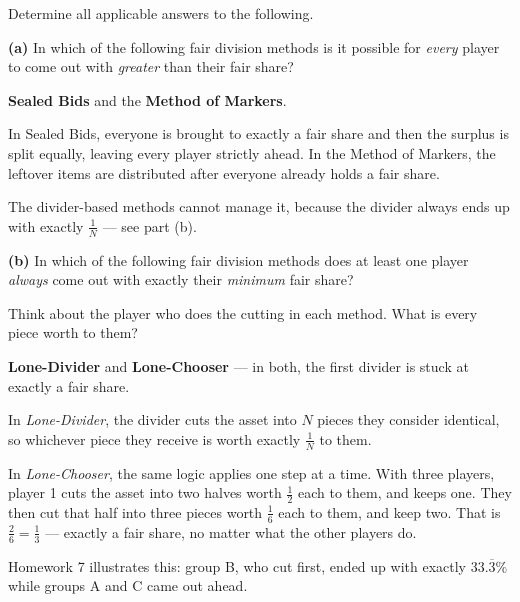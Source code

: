 \documentclass[12pt]{ximera}
\begin{document}
\begin{problem}
Determine all applicable answers to the following.

\begin{prompt}
\textbf{(a)} In which of the following fair division methods is it possible for
\emph{every} player to come out with \emph{greater} than their fair share?

\begin{selectAll}
\end{selectAll}

\begin{feedback}
\textbf{Sealed Bids} and the \textbf{Method of Markers}.

In Sealed Bids, everyone is brought to exactly a fair share and then the surplus is
split equally, leaving every player strictly ahead. In the Method of Markers, the
leftover items are distributed after everyone already holds a fair share.

The divider-based methods cannot manage it, because the divider always ends up with
exactly $\frac1N$ --- see part (b).
\end{feedback}
\end{prompt}

\begin{prompt}
\textbf{(b)} In which of the following fair division methods does at least one player
\emph{always} come out with exactly their \emph{minimum} fair share?

\begin{selectAll}
\end{selectAll}

\begin{hint}
Think about the player who does the cutting in each method. What is every piece worth to
them?
\end{hint}

\begin{feedback}
\textbf{Lone-Divider} and \textbf{Lone-Chooser} --- in both, the first divider is stuck
at exactly a fair share.

In \emph{Lone-Divider}, the divider cuts the asset into $N$ pieces they consider
identical, so whichever piece they receive is worth exactly $\frac1N$ to them.

In \emph{Lone-Chooser}, the same logic applies one step at a time. With three players,
player 1 cuts the asset into two halves worth $\frac12$ each to them, and keeps one.
They then cut that half into three pieces worth $\frac16$ each to them, and keep two.
That is $\frac26 = \frac13$ --- exactly a fair share, no matter what the other players
do.

Homework 7 illustrates this: group B, who cut first, ended up with exactly
$33.\overline{3}\%$ while groups A and C came out ahead.
\end{feedback}
\end{prompt}
\end{problem}
\end{document}
